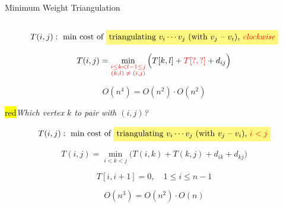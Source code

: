 
\begin{frame}{}
  \begin{exampleblock}{Minimum Weight Triangulation}

    \pause
    \vspace{-0.50cm}
    \begin{columns}
    \end{columns}
  \end{exampleblock}
\end{frame}

\begin{frame}{}

  \vspace{-0.70cm}
  \[
    T(i,j): \text{ $\min$ cost of \hl{yellow}{triangulating $v_i \cdots v_j$ (with $v_j$ -- $v_i$), \red{\it clockwise}}}
  \]

  \pause
  \[
    T(i,j) = \min_{\textcolor{red}{\substack{i \le k < l-1 \le j \\ (k,l) \;\neq\; (i,j)}}} \Big(T[k,l] + \textcolor{red}{T[?,?]} + d_{ij} \Big)
  \]

  \pause
  \[
    O(n^4) = O(n^2) \cdot O(n^2)
  \]
\end{frame}

\begin{frame}{}

  \pause
  \centerline{\hl{red}{\it Which vertex $k$ to pair with $(i,j)$?}}

  \pause
  \vspace{-0.20cm}
  \[
    T(i,j) : \text{ $\min$ cost of \hl{yellow}{triangulating $v_i \cdots v_j$ (with $v_j$ -- $v_i$), \red{$i < j$}}}
  \]

  \pause
  \[
    T(i,j) = \min_{i < k < j} \Big(T(i,k) + T(k,j) + d_{ik} + d_{kj}\Big)
  \]

  \pause
  \[
    T[i, i+1] = 0, \quad 1 \le i \le n-1
  \]

  \pause
  \[
    O(n^3) = O(n^2) \cdot O(n)
  \]
\end{frame}
